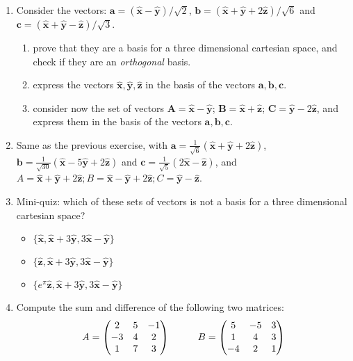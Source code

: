 \documentclass{article}
\begin{document}
\begin{enumerate}


\item Consider the vectors: $\mathbf{a}=( \mathbf{\hat{x}} - \mathbf{\hat{y}} ) / \sqrt{2} $, $\mathbf{b}=( \mathbf{\hat{x}} + \mathbf{\hat{y}} + 2 \mathbf{\hat{z}} ) / \sqrt{6}$ and $\mathbf{c}=(\mathbf{\hat{x}}+\mathbf{\hat{y}}-\mathbf{\hat{z}})/\sqrt{3}$. 
\begin{enumerate}
\item prove that they are a basis for a three dimensional cartesian space, and check if they are an \emph{orthogonal} basis. 

\item express the vectors $\mathbf{\hat{x}}, \mathbf{\hat{y}}, \mathbf{\hat{z}}$ in the basis of the vectors $\mathbf{a}, \mathbf{b}, \mathbf{c}$. 

\item consider now the set of vectors $\mathbf{A}=\mathbf{\hat{x}}-\mathbf{\hat{y}}$; $\mathbf{B}=\mathbf{\hat{x}}+\mathbf{\hat{z}}$; $\mathbf{C}=\mathbf{\hat{y}}-2\mathbf{\hat{z}}$, and express them in the basis of the vectors $\mathbf{a}, \mathbf{b}, \mathbf{c}$. 

\end{enumerate}


\item Same as the previous exercise, with $\mathbf{a}=\frac{1}{\sqrt{6}} ( \mathbf{\hat{x}} + \mathbf{\hat{y}} + 2 \mathbf{\hat{z}} ) $, $\mathbf{b}=\frac{1}{\sqrt{30}} (\mathbf{\hat{x}} - 5\mathbf{\hat{y}} + 2\mathbf{\hat{z}})$ and $\mathbf{c}= \frac{1}{\sqrt{5}} ( 2 \mathbf{\hat{x} }- \mathbf{\hat{z} })$, and 
$A=\mathbf{\hat{x}}+\mathbf{\hat{y}}+2\mathbf{\hat{z}}; B=\mathbf{\hat{x}}-\mathbf{\hat{y}}+2\mathbf{\hat{z}}; C=\mathbf{\hat{y}}-\mathbf{\hat{z}}$. 


\item Mini-quiz: which of these sets of vectors is not a basis for a three dimensional cartesian space? 
\begin{itemize}
\item $\{ \mathbf{\hat{x}}, \mathbf{\hat{x}}+3\mathbf{\hat{y}}, 3\mathbf{\hat{x}}-\mathbf{\hat{y}} \}$

\item $\{ \mathbf{\hat{z}}, \mathbf{\hat{x}}+3\mathbf{\hat{y}}, 3\mathbf{\hat{x}}-\mathbf{\hat{y}}\}$

\item $\{ e^\pi \mathbf{\hat{z}}, \mathbf{\hat{x}}+3\mathbf{\hat{y}}, 3\mathbf{\hat{x}}-\mathbf{\hat{y}}\}$
\end{itemize}


\item  Compute the sum and difference of the following two matrices:
$$A=\begin{pmatrix}
2 & 5 & -1 \\
-3 & 4 & 2 \\
1 & 7 & 3
\end{pmatrix} \hskip 1truecm B=\begin{pmatrix}
5 & -5 & 3 \\
1 & 4 & 3 \\
-4 & 2 & 1
\end{pmatrix}$$ 



\end{enumerate}
\end{document}
